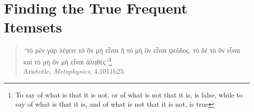 \chapter[Finding the True Frequent Itemsets]{Finding the True Frequent
Itemsets\protect{}}\label{ch:realfis}

\newif\ifarxiv
\arxivtrue

\begin{quote}
\begin{flushright}
  {\em``}\textgreek{τὸ μὲν γὰρ λέγειν τὸ ὂν μὴ εἶναι ἢ τὸ μὴ ὂν εἶναι ψεῦδος, τὸ
  δὲ τὸ ὂν εἶναι καὶ τὸ μὴ ὂν μὴ εἶναι ἀληθές}{\em''}\footnote{To say of what is
  that it is not, or of what is not that it is, is false, while to say of what
  is that it is, and of what is not that it is not, is true}\\Aristotle, {\em
  Metaphysics}, 4.1011b25.
\end{flushright}
\end{quote}

%





%




